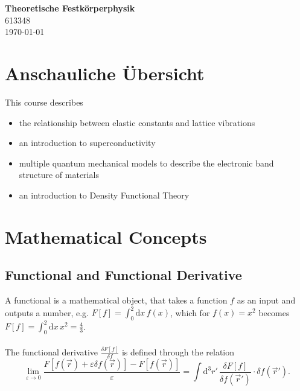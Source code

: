 \documentclass{article}
\newcommand{\diff}{\mathrm{d}}
\begin{document}
\begin{center}
	\Large{\textbf{Theoretische Festkörperphysik}}\\
	\small{613348}\\
	\small{\today}
\end{center}

\tableofcontents


\newpage


\section*{Anschauliche Übersicht}
This course describes
	\begin{itemize}
		\item the relationship between elastic constants and lattice vibrations
		
		
		\item an introduction to superconductivity
		
		
		\item multiple quantum mechanical models to describe the electronic band structure of materials
		
		
		\item an introduction to Density Functional Theory
	\end{itemize}


\newpage


\section{Mathematical Concepts}
\subsection{Functional and Functional Derivative}
A functional is a mathematical object, that takes a function $f$ as an input and outputs a number, e.g. $F[f] = \int_0^2 \diff x \, f(x)$, which for $f(x)=x^2$ becomes $F[f] = \int_0^2 \diff x \, x^2 = \frac{4}{3}$.\\
\\
The functional derivative $\frac{\delta F[f]}{\delta f}$ is defined through the relation
	\begin{equation}
		\lim_{\varepsilon\to 0} \frac{F[f(\vec{r}) + \varepsilon \delta f(\vec{r})] - F[f(\vec{r})]}{\varepsilon} = \int \diff^3 r' \, \frac{\delta F[f]}{\delta f(\vec{r}')} \cdot \delta f(\vec{r}').
	\end{equation}
\end{document}
